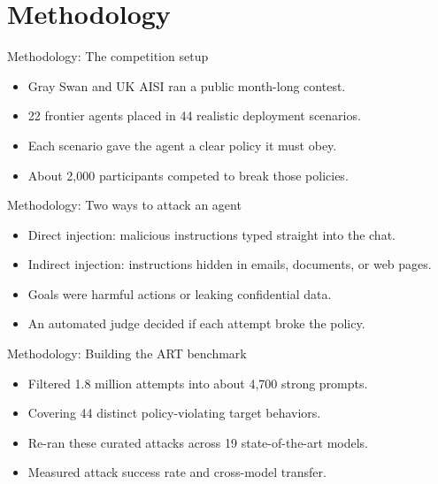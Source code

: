 \documentclass[10pt]{beamer}
\begin{document}
\section{Methodology}
\begin{frame}[allowframebreaks]{Methodology: The competition setup}
\begin{itemize}
  \item Gray Swan and UK AISI ran a public month-long contest.
  \item 22 frontier agents placed in 44 realistic deployment scenarios.
  \item Each scenario gave the agent a clear policy it must obey.
  \item About 2,000 participants competed to break those policies.
\end{itemize}
\end{frame}
\begin{frame}[allowframebreaks]{Methodology: Two ways to attack an agent}
\begin{itemize}
  \item Direct injection: malicious instructions typed straight into the chat.
  \item Indirect injection: instructions hidden in emails, documents, or web pages.
  \item Goals were harmful actions or leaking confidential data.
  \item An automated judge decided if each attempt broke the policy.
\end{itemize}
\end{frame}
\begin{frame}[allowframebreaks]{Methodology: Building the ART benchmark}
\begin{itemize}
  \item Filtered 1.8 million attempts into about 4,700 strong prompts.
  \item Covering 44 distinct policy-violating target behaviors.
  \item Re-ran these curated attacks across 19 state-of-the-art models.
  \item Measured attack success rate and cross-model transfer.
\end{itemize}
\end{frame}
\end{document}
